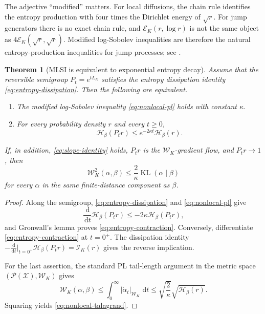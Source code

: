 \documentclass[11pt]{article}
\newtheorem{theorem}{Theorem}[section]
\theoremstyle{definition}
\DeclareMathOperator{\KL}{KL}
\newcommand{\Pp}{\mathcal P}
\newcommand{\dd}{\,\mathrm d}
\newcommand{\cE}{\mathcal E}
\newcommand{\cI}{\mathcal I}
\newcommand{\cH}{\mathcal H}
\newcommand{\cW}{\mathcal W}
\newcommand{\abs}[1]{\left\lvert #1\right\rvert}
\begin{document}
The adjective ``modified'' matters.  For local diffusions, the chain rule
identifies the entropy production with four times the Dirichlet energy of
$\sqrt r$.  For jump generators there is no exact chain rule, and
$\cE_K(r,\log r)$ is not the same object as
$4\cE_K(\sqrt r,\sqrt r)$.  Modified log-Sobolev inequalities are therefore
the natural entropy-production inequalities for jump processes; see
\citet{BobkovTetali2006,AdamczakPolaczykStrzelecki2022}.

\begin{theorem}[MLSI is equivalent to exponential entropy decay]
\label{thm:mlsi-equivalence}
Assume that the reversible semigroup $P_t=e^{tL_K}$ satisfies the entropy
dissipation identity \eqref{eq:entropy-dissipation}.  Then the following are
equivalent.
\begin{enumerate}[label=(\roman*)]
  \item The modified log-Sobolev inequality \eqref{eq:nonlocal-pl} holds with constant
  $\kappa$.
  \item For every probability density $r$ and every $t\geq0$,
  \begin{equation}\label{eq:entropy-contraction}
    \cH_\beta(P_t r)
    \leq e^{-2\kappa t}\cH_\beta(r).
  \end{equation}
\end{enumerate}
If, in addition, \eqref{eq:slope-identity} holds, $P_t r$ is the
$\cW_K$-gradient flow, and $P_t r\to1$, then
\begin{equation}\label{eq:nonlocal-talagrand}
  \cW_K^2(\alpha,\beta)
  \leq \frac{2}{\kappa}\KL(\alpha\mid\beta)
\end{equation}
for every $\alpha$ in the same finite-distance component as $\beta$.
\end{theorem}

\begin{proof}
Along the semigroup, \eqref{eq:entropy-dissipation} and
\eqref{eq:nonlocal-pl} give
\[
  \frac{\dd}{\dd t}\cH_\beta(P_t r)
  \leq -2\kappa\cH_\beta(P_t r),
\]
and Gronwall's lemma proves \eqref{eq:entropy-contraction}.  Conversely,
differentiate \eqref{eq:entropy-contraction} at $t=0^+$.  The dissipation
identity $-\frac{\dd}{\dd t}|_{t=0^+}\cH_\beta(P_t r)=\cI_K(r)$ gives the
reverse implication.

For the last assertion, the standard PL tail-length argument in the metric
space $(\Pp(\mathcal X),\cW_K)$ gives
\[
  \cW_K(\alpha,\beta)
  \leq \int_0^\infty\abs{\dot\alpha_t}_{\cW_K}\,\dd t
  \leq \sqrt{\frac{2}{\kappa}}\sqrt{\cH_\beta(r)}.
\]
Squaring yields \eqref{eq:nonlocal-talagrand}.
\end{proof}
\end{document}
